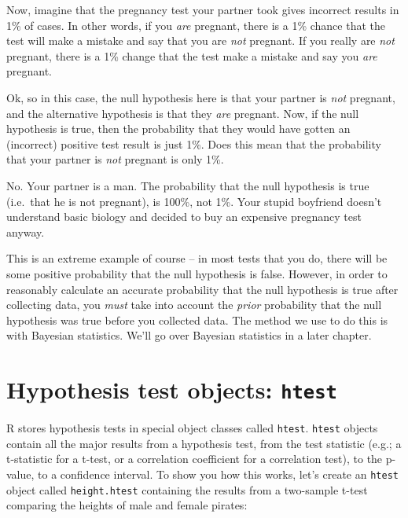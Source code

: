 \documentclass[]{book}
\newenvironment{Shaded}{\begin{snugshade}}{\end{snugshade}}
\newcommand{\KeywordTok}[1]{\textcolor[rgb]{0.13,0.29,0.53}{\textbf{#1}}}
\newcommand{\DataTypeTok}[1]{\textcolor[rgb]{0.13,0.29,0.53}{#1}}
\newcommand{\StringTok}[1]{\textcolor[rgb]{0.31,0.60,0.02}{#1}}
\newcommand{\CommentTok}[1]{\textcolor[rgb]{0.56,0.35,0.01}{\textit{#1}}}
\newcommand{\OperatorTok}[1]{\textcolor[rgb]{0.81,0.36,0.00}{\textbf{#1}}}
\newcommand{\NormalTok}[1]{#1}
\theoremstyle{definition}
\theoremstyle{definition}
\theoremstyle{remark}
\begin{document}
Now, imagine that the pregnancy test your partner took gives incorrect
results in 1\% of cases. In other words, if you \emph{are} pregnant,
there is a 1\% chance that the test will make a mistake and say that you
are \emph{not} pregnant. If you really are \emph{not} pregnant, there is
a 1\% change that the test make a mistake and say you \emph{are}
pregnant.

Ok, so in this case, the null hypothesis here is that your partner is
\emph{not} pregnant, and the alternative hypothesis is that they
\emph{are} pregnant. Now, if the null hypothesis is true, then the
probability that they would have gotten an (incorrect) positive test
result is just 1\%. Does this mean that the probability that your
partner is \emph{not} pregnant is only 1\%.

No. Your partner is a man. The probability that the null hypothesis is
true (i.e.~that he is not pregnant), is 100\%, not 1\%. Your stupid
boyfriend doesn't understand basic biology and decided to buy an
expensive pregnancy test anyway.

This is an extreme example of course -- in most tests that you do, there
will be some positive probability that the null hypothesis is false.
However, in order to reasonably calculate an accurate probability that
the null hypothesis is true after collecting data, you \emph{must} take
into account the \emph{prior} probability that the null hypothesis was
true before you collected data. The method we use to do this is with
Bayesian statistics. We'll go over Bayesian statistics in a later
chapter.

\section{\texorpdfstring{Hypothesis test objects:
\texttt{htest}}{Hypothesis test objects: htest}}\label{hypothesis-test-objects-htest}

R stores hypothesis tests in special object classes called
\texttt{htest}. \texttt{htest} objects contain all the major results
from a hypothesis test, from the test statistic (e.g.; a t-statistic for
a t-test, or a correlation coefficient for a correlation test), to the
p-value, to a confidence interval. To show you how this works, let's
create an \texttt{htest} object called \texttt{height.htest} containing
the results from a two-sample t-test comparing the heights of male and
female pirates:

\begin{Shaded}
\end{Shaded}
\end{document}
